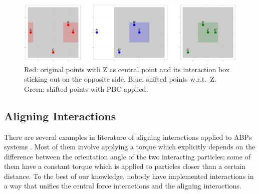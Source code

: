 \documentclass[../../master_thesis_np.tex]{subfiles}
\begin{document}
	\begin{figure}[htp]
		\centering
		\includegraphics[width=\textwidth]{periodic_interaction.png}
		\caption{Red: original points with Z as central point and its interaction box sticking out on the opposite side. Blue: shifted points w.r.t.\ Z. Green: shifted points with PBC applied.}
		\label{fig:periodicint}
	\end{figure}
	

	\subsection{Aligning Interactions} \label{alignint}

	There are several examples in literature of aligning interactions applied to ABPs systems \cite{martin-gomez_collective_2018, callegari_numerical_2019}.
	Most of them involve applying a torque which explicitly depends on the difference between the orientation angle of the two interacting particles; some of them have a constant torque which is applied to particles closer than a certain distance.
	{\color{brown}To the best of our knowledge, nobody have implemented interactions in a way that unifies the central force interactions and the aligning interactions.}
	
\end{document}
